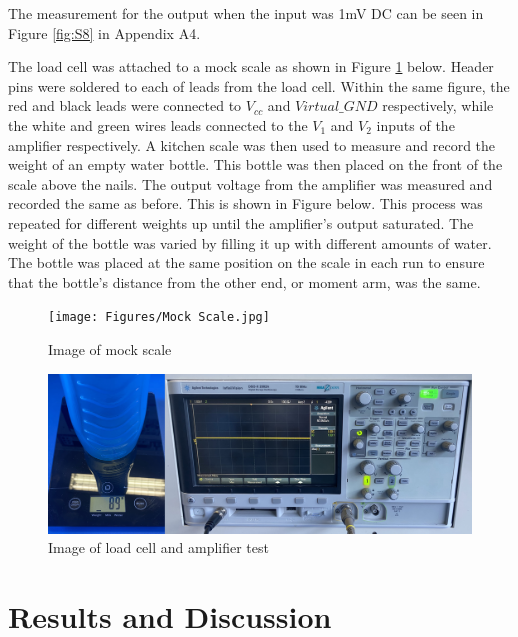 \documentclass[class=report,11pt,crop=false]{standalone}
\begin{document}
	The measurement for the output when the input was 1mV DC can be seen in Figure \ref{fig:S8} in Appendix A4.
	
	The load cell was attached to a mock scale as shown in Figure \ref{fig:S9} below. Header pins were soldered to each of leads from the load cell. Within the same figure, the red and black leads were connected to $V_{cc}$ and $Virtual\_GND$ respectively, while the white and green wires leads connected to the $V_1$ and $V_2$ inputs of the amplifier respectively. A kitchen scale was then used to measure and record the weight of an empty water bottle. This bottle was then placed on the front of the scale above the nails. The output voltage from the amplifier was measured and recorded the same as before. This is shown in Figure below. This process was repeated for different weights up until the amplifier's output saturated. The weight of the bottle was varied by filling it up with different amounts of water. The bottle was placed at the same position on the scale in each run to ensure that the bottle's distance from the other end, or moment arm, was the same. 
	\begin{figure}[h!]
		\centering
		\texttt{[image: Figures/Mock Scale.jpg]}
		\caption{Image of mock scale}
		\label{fig:S9}
	\end{figure}
	
	\begin{figure}[h!]
		\centering
		\includegraphics[width=0.8\linewidth]{Figures/ATP3.jpg}
		\caption{Image of load cell and amplifier test}
		\label{fig:S10}
	\end{figure}
	
	\section{Results and Discussion}
\end{document}
